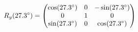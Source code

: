 \documentclass[preview]{standalone}
\begin{document}
\begin{align*}
\special{dvisvgm:raw <g id='unique000'>}R_y(27.3^\circ) = \begin{pmatrix} \cos(27.3^\circ) & 0 & -\sin(27.3^\circ) \\ 0 & 1 & 0 \\ \sin(27.3^\circ) & 0 & \cos(27.3^\circ) \end{pmatrix}\special{dvisvgm:raw </g>}
\end{align*}
\end{document}
